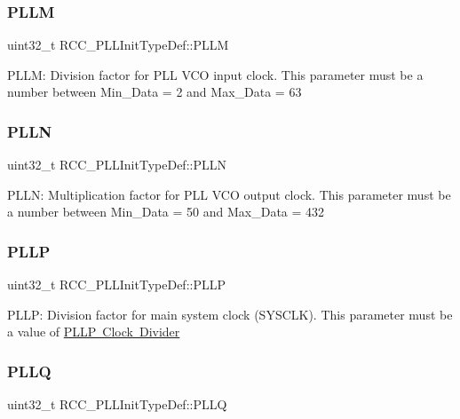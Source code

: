 \subsubsection{\texorpdfstring{PLLM}{PLLM}}
{\footnotesize\ttfamily uint32\+\_\+t R\+C\+C\+\_\+\+P\+L\+L\+Init\+Type\+Def\+::\+P\+L\+LM}

P\+L\+LM\+: Division factor for P\+LL V\+CO input clock. This parameter must be a number between Min\+\_\+\+Data = 2 and Max\+\_\+\+Data = 63 \mbox{\label{struct_r_c_c___p_l_l_init_type_def_a2482608639ebfffc51a41135c979369b}} 
\subsubsection{\texorpdfstring{PLLN}{PLLN}}
{\footnotesize\ttfamily uint32\+\_\+t R\+C\+C\+\_\+\+P\+L\+L\+Init\+Type\+Def\+::\+P\+L\+LN}

P\+L\+LN\+: Multiplication factor for P\+LL V\+CO output clock. This parameter must be a number between Min\+\_\+\+Data = 50 and Max\+\_\+\+Data = 432 \mbox{\label{struct_r_c_c___p_l_l_init_type_def_a4ecedf3ef401fa564aa636824fc3ded0}} 
\subsubsection{\texorpdfstring{PLLP}{PLLP}}
{\footnotesize\ttfamily uint32\+\_\+t R\+C\+C\+\_\+\+P\+L\+L\+Init\+Type\+Def\+::\+P\+L\+LP}

P\+L\+LP\+: Division factor for main system clock (S\+Y\+S\+C\+LK). This parameter must be a value of \mbox{\hyperlink{group___r_c_c___p_l_l_p___clock___divider}{P\+L\+LP Clock Divider}} \mbox{\label{struct_r_c_c___p_l_l_init_type_def_a2b69dfec4b8ab52d649a71d141892691}} 
\subsubsection{\texorpdfstring{PLLQ}{PLLQ}}
{\footnotesize\ttfamily uint32\+\_\+t R\+C\+C\+\_\+\+P\+L\+L\+Init\+Type\+Def\+::\+P\+L\+LQ}

